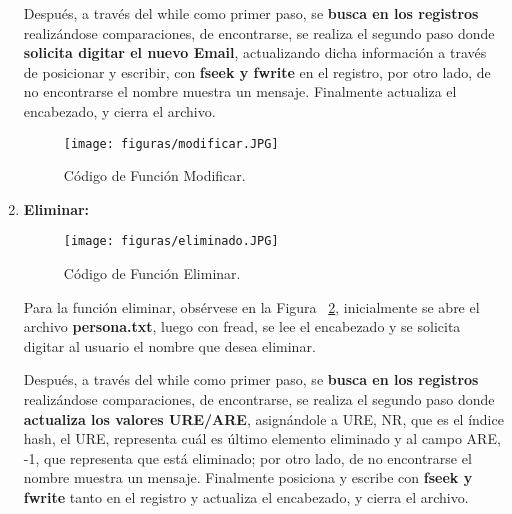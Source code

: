 \documentclass[10pt,conference]{IEEEtran}
\begin{document}
\begin{enumerate}[]
        Después, a través del while como primer paso, se \textbf{busca en los registros} realizándose comparaciones, de encontrarse, se realiza el segundo paso donde \textbf{solicita digitar el nuevo Email}, actualizando dicha información a través de posicionar y escribir, con \textbf{fseek y fwrite} en el registro, por otro lado, de no encontrarse el nombre muestra un mensaje. Finalmente actualiza el encabezado, y cierra el archivo.
        
        \begin{figure}[H]
            \begin{center}
            \texttt{[image: figuras/modificar.JPG]}
            \caption{Código de Función Modificar.}
            \label{f-modifi} 
            \end{center}
        \end{figure}
        
    \item {\textbf{Eliminar:}}
        \begin{figure}[H]
            \begin{center}
            \texttt{[image: figuras/eliminado.JPG]}
            \caption{Código de Función Eliminar.}
            \label{f-elimi} 
            \end{center}
        \end{figure}
        
        \par Para la función eliminar, obsérvese en la Figura ~\ref{f-elimi}, inicialmente se abre el archivo \textbf{persona.txt}, luego con fread, se lee el encabezado y se solicita digitar al usuario el nombre que desea eliminar.
        
        Después, a través del while como primer paso, se \textbf{busca en los registros} realizándose comparaciones, de encontrarse, se realiza el segundo paso donde \textbf{actualiza los valores URE/ARE}, asignándole a URE, NR, que es el índice hash, el URE, representa cuál es último elemento eliminado y al campo ARE, -1, que representa que está eliminado; por otro lado, de no encontrarse el nombre muestra un mensaje. Finalmente posiciona y escribe con \textbf{fseek y fwrite} tanto en el registro y actualiza el encabezado, y cierra el archivo.
        
\end{enumerate}
\end{document}
